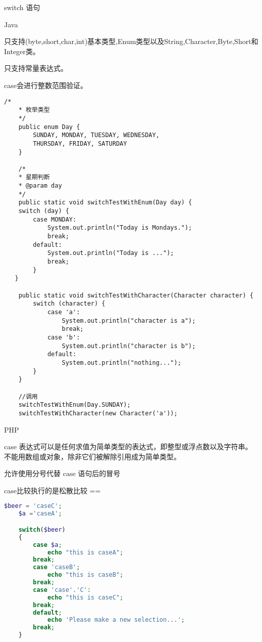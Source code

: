 
switch 语句

Java

只支持(byte,short,char,int)基本类型,Enum类型以及String,Character,Byte,Short和Integer类。

只支持常量表达式。

case会进行整数范围验证。

\begin{lstlisting}[style=cjava,caption={swtich},label=useless]
    /*
    * 枚举类型
    */
    public enum Day {
        SUNDAY, MONDAY, TUESDAY, WEDNESDAY,
        THURSDAY, FRIDAY, SATURDAY 
    }

    /*
    * 星期判断
    * @param day
    */
    public static void switchTestWithEnum(Day day) {
    switch (day) {
        case MONDAY:
            System.out.println("Today is Mondays.");
            break;
        default:
            System.out.println("Today is ...");
            break;
        }
   }

    public static void switchTestWithCharacter(Character character) {
        switch (character) {
            case 'a':
                System.out.println("character is a");
                break;
            case 'b':
                System.out.println("character is b");
            default:
                System.out.println("nothing...");
        }
    }

    //调用
    switchTestWithEnum(Day.SUNDAY);
    switchTestWithCharacter(new Character('a'));
\end{lstlisting}

PHP

case 表达式可以是任何求值为简单类型的表达式，即整型或浮点数以及字符串。不能用数组或对象，除非它们被解除引用成为简单类型。

允许使用分号代替 case 语句后的冒号

case比较执行的是松散比较 ==

 \begin{lstlisting}[language=php]
    $beer = 'caseC';
    $a ='caseA';

    switch($beer)
    {
	    case $a;
		    echo "this is caseA";
		break;
	    case 'caseB';
		    echo "this is caseB";
		break;
	    case 'case'.'C':
	        echo "this is caseC";
	    break;
        default;
            echo 'Please make a new selection...';
        break;
    }
\end{lstlisting}
    
